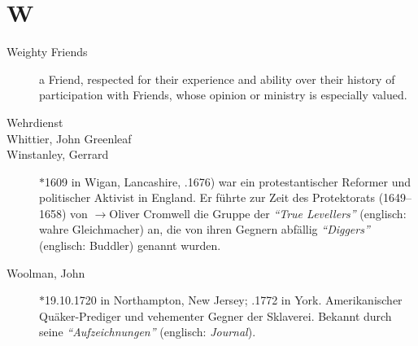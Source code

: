 \section*{W}

\articlesize

\begin{description}
 \item[Weighty Friends]
    a Friend, respected for their experience and ability over their history of participation with Friends, whose opinion or ministry is especially valued.

 
 \item[Wehrdienst]

 \item[Whittier, John Greenleaf]

 \item[Winstanley, Gerrard] $\ast$1609 in Wigan, Lancashire, .1676) war ein protestantischer Reformer und politischer Aktivist in England. Er führte zur Zeit des Protektorats (1649–1658) von $\to$Oliver Cromwell die Gruppe der \textit{"`True Levellers"'} (englisch: wahre Gleichmacher) an, die von ihren Gegnern abfällig \textit{"`Diggers"'} (englisch: Buddler) genannt wurden.

\item[Woolman, John] $\ast$19.10.1720 in Northampton, New Jersey; .1772 in York. Amerikanischer Quäker-Prediger und vehementer Gegner der Sklaverei. Bekannt durch seine \textit{"`Aufzeichnungen"'} (englisch: \textit{Journal}).

 \end{description}


\normalsize